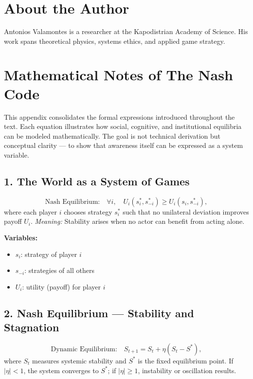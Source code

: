 \documentclass[12pt,twoside]{book}
\begin{document}
\chapter*{About the Author}
Antonios Valamontes is a researcher at the Kapodistrian Academy of Science. His work spans theoretical physics, systems ethics, and applied game strategy.

\chapter{Mathematical Notes of The Nash Code}

\noindent
This appendix consolidates the formal expressions introduced throughout the text.  
Each equation illustrates how social, cognitive, and institutional equilibria can be modeled mathematically.  
The goal is not technical derivation but conceptual clarity — to show that awareness itself can be expressed as a system variable.

\section*{1. The World as a System of Games}
\[
\text{Nash Equilibrium:}\quad
\forall i,\quad U_i(s_i^*, s_{-i}^*) \ge U_i(s_i, s_{-i}^*),
\]
where each player \( i \) chooses strategy \( s_i^* \) such that no unilateral deviation improves payoff \( U_i \).  
\emph{Meaning:} Stability arises when no actor can benefit from acting alone.

\medskip
\noindent
\textbf{Variables:}
\begin{itemize}
  \item \(s_i\): strategy of player \(i\)
  \item \(s_{-i}\): strategies of all others
  \item \(U_i\): utility (payoff) for player \(i\)
\end{itemize}

\section*{2. Nash Equilibrium — Stability and Stagnation}
\[
\text{Dynamic Equilibrium:}\quad
S_{t+1} = S_t + \eta(S_t - S^*),
\]
where \(S_t\) measures systemic stability and \(S^*\) is the fixed equilibrium point.  
If \(|\eta| < 1\), the system converges to \(S^*\); if \(|\eta| \ge 1\), instability or oscillation results.
\end{document}
